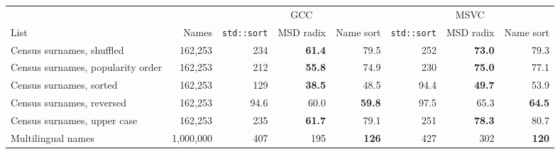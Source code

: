 \begin{tabular}{lrrrrrrr}
\toprule
 & & \multicolumn{3}{c}{GCC} & \multicolumn{3}{c}{MSVC}\\
\cmidrule(lr){3-5} \cmidrule(lr){6-8}
List & Names & \texttt{std::sort} & MSD radix & Name sort & \texttt{std::sort} & MSD radix & Name sort\\
\midrule
Census surnames, shuffled & 162{,}253 & 234 & \textbf{61.4} & 79.5 & 252 & \textbf{73.0} & 79.3\\
Census surnames, popularity order & 162{,}253 & 212 & \textbf{55.8} & 74.9 & 230 & \textbf{75.0} & 77.1\\
Census surnames, sorted & 162{,}253 & 129 & \textbf{38.5} & 48.5 & 94.4 & \textbf{49.7} & 53.9\\
Census surnames, reversed & 162{,}253 & 94.6 & 60.0 & \textbf{59.8} & 97.5 & 65.3 & \textbf{64.5}\\
Census surnames, upper case & 162{,}253 & 235 & \textbf{61.7} & 79.1 & 251 & \textbf{78.3} & 80.7\\
Multilingual names & 1{,}000{,}000 & 407 & 195 & \textbf{126} & 427 & 302 & \textbf{120}\\
\bottomrule
\end{tabular}
